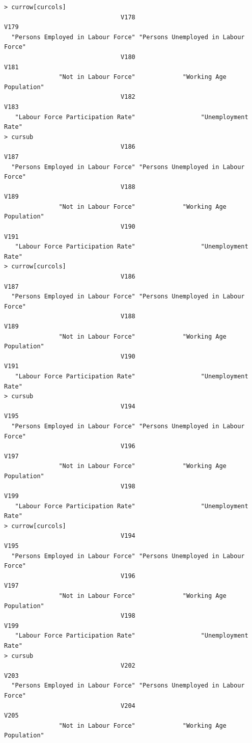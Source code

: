 \documentclass[a4paper]{article}
\begin{document}
\begin{verbatim}
> currow[curcols] 
                                V178                                 V179 
  "Persons Employed in Labour Force" "Persons Unemployed in Labour Force" 
                                V180                                 V181 
               "Not in Labour Force"             "Working Age Population" 
                                V182                                 V183 
   "Labour Force Participation Rate"                  "Unemployment Rate" 
> cursub 
                                V186                                 V187 
  "Persons Employed in Labour Force" "Persons Unemployed in Labour Force" 
                                V188                                 V189 
               "Not in Labour Force"             "Working Age Population" 
                                V190                                 V191 
   "Labour Force Participation Rate"                  "Unemployment Rate" 
> currow[curcols] 
                                V186                                 V187 
  "Persons Employed in Labour Force" "Persons Unemployed in Labour Force" 
                                V188                                 V189 
               "Not in Labour Force"             "Working Age Population" 
                                V190                                 V191 
   "Labour Force Participation Rate"                  "Unemployment Rate" 
> cursub 
                                V194                                 V195 
  "Persons Employed in Labour Force" "Persons Unemployed in Labour Force" 
                                V196                                 V197 
               "Not in Labour Force"             "Working Age Population" 
                                V198                                 V199 
   "Labour Force Participation Rate"                  "Unemployment Rate" 
> currow[curcols] 
                                V194                                 V195 
  "Persons Employed in Labour Force" "Persons Unemployed in Labour Force" 
                                V196                                 V197 
               "Not in Labour Force"             "Working Age Population" 
                                V198                                 V199 
   "Labour Force Participation Rate"                  "Unemployment Rate" 
> cursub 
                                V202                                 V203 
  "Persons Employed in Labour Force" "Persons Unemployed in Labour Force" 
                                V204                                 V205 
               "Not in Labour Force"             "Working Age Population" 

\end{verbatim}
\end{document}
